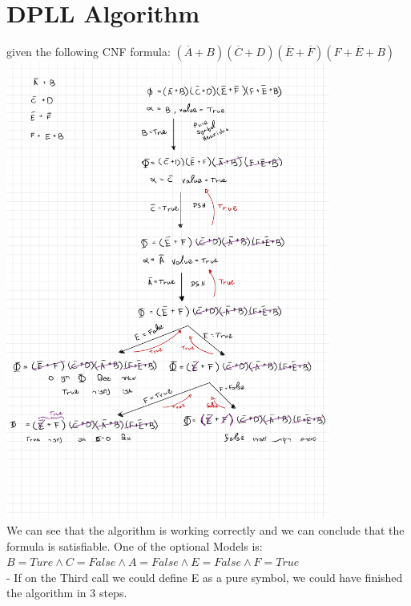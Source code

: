 \documentclass{article}
\begin{document}
\section{DPLL Algorithm}
given the following CNF formula: $(\overline A +B)(\overline C + D)(\overline E + \overline F)(F + \overline E + B)$\\
\includegraphics[width=0.8\textwidth]{DPLL.jpg}\\

We can see that the algorithm is working correctly and we can conclude that the formula is satisfiable.
One of the optional Models is: $B = Ture \land C = False \land A = False \land E = False \land F = True$\\
- If on the Third call we could define E as a pure symbol, we could have finished the algorithm in 3 steps.
\end{document}
